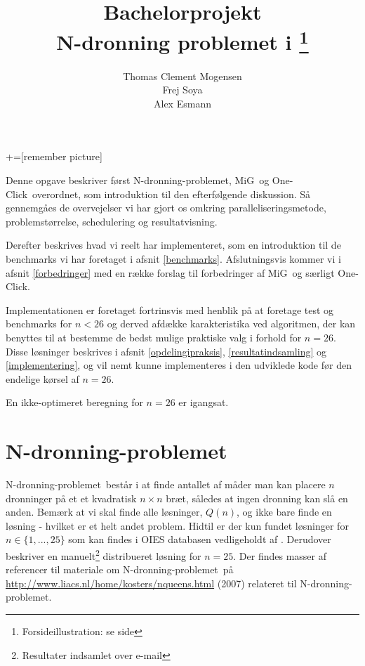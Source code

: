 \documentclass[final,a4paper,11pt]{article}
\title{Bachelorprojekt\\N-dronning problemet i \mig\footnote{Forsideillustration: se side \pageref{fig:action}}}
\author{Thomas Clement Mogensen \\ Frej Soya \\ Alex Esmann}
\newcommand{\mig}{MiG}
\newcommand{\oc}{One-Click}
\newcommand{\nq}{N-dronning-problemet}
\renewcommand{\thepage}{\roman{page}}
\begin{document}
\usetikzlibrary{trees,backgrounds,shapes,snakes}
+=[remember picture]


\maketitle
\tableofcontents
\newpage

\renewcommand{\thepage}{\arabic{page}}
\pagestyle{fancy}                              %
\fancyhead[R]{\thepage\ af \pageref{LastPage}} %
\fancyhead[L]{\nq\ i \mig}              %
\fancyfoot[C]{}                                %
\setcounter{page}{1}

\abstract
Denne opgave beskriver først \nq, \mig\ og \oc\ overordnet, som introduktion til den efterfølgende diskussion. Så gennemgåes de overvejelser vi har gjort os omkring paralleliseringsmetode, problemstørrelse, schedulering og resultatvisning. 

Derefter beskrives hvad vi reelt har implementeret, som en introduktion til de benchmarks vi har foretaget i afsnit \ref{benchmarks}. 
Afslutningsvis kommer vi i afsnit \ref{forbedringer} med en række forslag til forbedringer af \mig\ og særligt \oc.

Implementationen er foretaget fortrinsvis med henblik på at foretage test og benchmarks for $n<26$ og derved afdække karakteristika ved algoritmen, der kan benyttes til at bestemme de bedst mulige praktiske valg i forhold for $n=26$. Disse løsninger beskrives i afsnit \ref{opdelingipraksis}, \ref{resultatindsamling} og \ref{implementering}, og vil nemt kunne implementeres i den udviklede kode før den endelige kørsel af $n=26$. 

En ikke-optimeret beregning for $n=26$ er igangsat.


\section{\nq}\label{nqueenproblemet}

\nq\ består i at finde antallet af måder man kan placere $n$ dronninger på et et kvadratisk $n \times n$ bræt, således at ingen dronning kan slå en anden. Bemærk at vi skal finde alle løsninger, $Q(n)$, og ikke bare finde en løsning - hvilket er et helt andet problem. Hidtil er der kun fundet løsninger for $n \in \{1,...,25\}$ som kan findes i OIES databasen vedligeholdt af \citep{sekvenser}. Derudover beskriver \cite{etsi} en manuelt\footnote{Resultater indsamlet over e-mail} distribueret løsning for $n=25$. Der findes masser af referencer til materiale om \nq\ på \url{http://www.liacs.nl/home/kosters/nqueens.html} (2007) relateret til \nq. 
\end{document}
